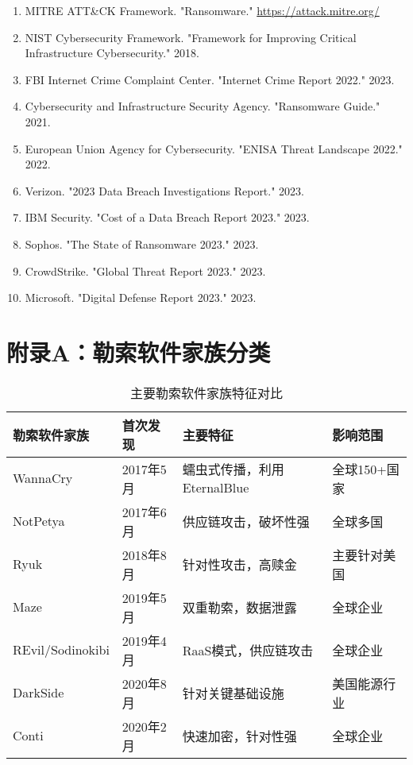 \documentclass[12pt,a4paper]{article}
\begin{document}
\begin{enumerate}
    \item MITRE ATT\&CK Framework. "Ransomware." \url{https://attack.mitre.org/}
    \item NIST Cybersecurity Framework. "Framework for Improving Critical Infrastructure Cybersecurity." 2018.
    \item FBI Internet Crime Complaint Center. "Internet Crime Report 2022." 2023.
    \item Cybersecurity and Infrastructure Security Agency. "Ransomware Guide." 2021.
    \item European Union Agency for Cybersecurity. "ENISA Threat Landscape 2022." 2022.
    \item Verizon. "2023 Data Breach Investigations Report." 2023.
    \item IBM Security. "Cost of a Data Breach Report 2023." 2023.
    \item Sophos. "The State of Ransomware 2023." 2023.
    \item CrowdStrike. "Global Threat Report 2023." 2023.
    \item Microsoft. "Digital Defense Report 2023." 2023.
\end{enumerate}

\appendix

\section{附录A：勒索软件家族分类}

\begin{table}[h]
\centering
\begin{tabular}{|l|l|l|l|}
\hline
\textbf{勒索软件家族} & \textbf{首次发现} & \textbf{主要特征} & \textbf{影响范围} \\
\hline
WannaCry & 2017年5月 & 蠕虫式传播，利用EternalBlue & 全球150+国家 \\
\hline
NotPetya & 2017年6月 & 供应链攻击，破坏性强 & 全球多国 \\
\hline
Ryuk & 2018年8月 & 针对性攻击，高赎金 & 主要针对美国 \\
\hline
Maze & 2019年5月 & 双重勒索，数据泄露 & 全球企业 \\
\hline
REvil/Sodinokibi & 2019年4月 & RaaS模式，供应链攻击 & 全球企业 \\
\hline
DarkSide & 2020年8月 & 针对关键基础设施 & 美国能源行业 \\
\hline
Conti & 2020年2月 & 快速加密，针对性强 & 全球企业 \\
\hline
\end{tabular}
\caption{主要勒索软件家族特征对比}
\end{table}
\end{document}
